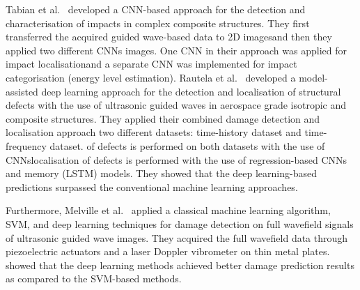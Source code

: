 Tabian et al.~\cite{Tabian2019} developed a CNN-based approach for the detection and characterisation of impacts in complex composite structures.
They first transferred the acquired guided wave-based data to 2D images\DIFaddbegin \DIFadd{, }\DIFaddend and then they applied two different CNNs \DIFdelbegin {}\DIFdelend \DIFaddbegin {}\DIFaddend images.
One CNN in their approach was applied for impact localisation\DIFaddbegin \DIFadd{, }\DIFaddend and a separate CNN was implemented for impact categorisation (energy level estimation).
Rautela et al.~\cite{rautela2021ultrasonic} developed a model-assisted deep learning approach for the detection and localisation of structural defects with the use of ultrasonic guided waves in aerospace grade isotropic and composite structures. 
They applied their combined damage detection and localisation approach \DIFdelbegin {}\DIFdelend \DIFaddbegin {}\DIFaddend two different datasets: \DIFaddbegin {}\DIFaddend time-history dataset and \DIFaddbegin {}\DIFaddend time-frequency dataset. 
\DIFdelbegin {}\DIFdelend \DIFaddbegin {}\DIFaddend of defects is performed on both datasets with the use of CNNs\DIFdelbegin {}\DIFdelend \DIFaddbegin {}\DIFaddend localisation of defects is performed with the use of regression-based CNNs and \DIFdelbegin {}\DIFdelend \DIFaddbegin {}\DIFaddend memory (LSTM) models. 
They showed that the deep learning-based predictions surpassed the conventional machine learning approaches.

Furthermore, Melville et al.~\cite{Melville2018} applied a classical machine learning algorithm, SVM, and deep learning techniques for damage detection on \DIFaddbegin {}\DIFaddend full wavefield signals of ultrasonic guided wave images.
They acquired the full wavefield data through piezoelectric actuators and a laser Doppler vibrometer on thin metal plates.
\DIFdelbegin {}\DIFdelend \DIFaddbegin {}\DIFaddend showed that the deep learning methods achieved \DIFdelbegin {}\DIFdelend better damage prediction results as compared to the SVM-based methods.

